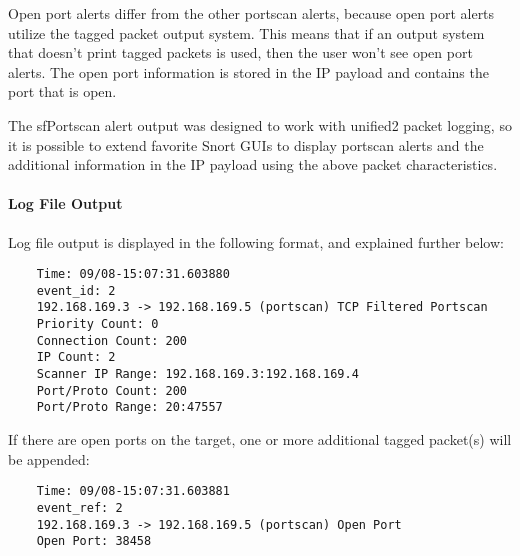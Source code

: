 \documentclass[english]{report}
\begin{document}
Open port alerts differ from the other portscan alerts, because open port
alerts utilize the tagged packet output system.  This means that if an output
system that doesn't print tagged packets is used, then the user won't see open
port alerts.  The open port information is stored in the IP payload and
contains the port that is open.

The sfPortscan alert output was designed to work with unified2 packet logging,
so it is possible to extend favorite Snort GUIs to display portscan alerts and
the additional information in the IP payload using the above packet
characteristics.

\paragraph{Log File Output}

Log file output is displayed in the following format, and explained further
below:

\begin{verbatim}
    Time: 09/08-15:07:31.603880
    event_id: 2
    192.168.169.3 -> 192.168.169.5 (portscan) TCP Filtered Portscan
    Priority Count: 0
    Connection Count: 200
    IP Count: 2
    Scanner IP Range: 192.168.169.3:192.168.169.4
    Port/Proto Count: 200
    Port/Proto Range: 20:47557
\end{verbatim}

If there are open ports on the target, one or more additional tagged packet(s)
will be appended:

\begin{verbatim}
    Time: 09/08-15:07:31.603881
    event_ref: 2
    192.168.169.3 -> 192.168.169.5 (portscan) Open Port
    Open Port: 38458
\end{verbatim}
\end{document}
